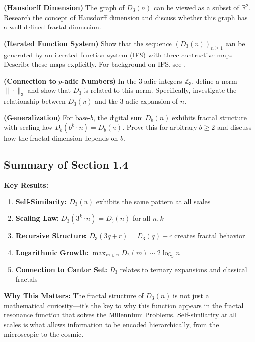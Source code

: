 \begin{exercise}
\textbf{(Hausdorff Dimension)} The graph of $D_3(n)$ can be viewed as a subset of $\mathbb{R}^2$. Research the concept of Hausdorff dimension and discuss whether this graph has a well-defined fractal dimension.
\end{exercise}

\begin{exercise}
\textbf{(Iterated Function System)} Show that the sequence $(D_3(n))_{n \geq 1}$ can be generated by an iterated function system (IFS) with three contractive maps. Describe these maps explicitly. For background on IFS, see \cite{barnsley1988,hutchinson1981fractals}.
\end{exercise}

\begin{exercise}
\textbf{(Connection to $p$-adic Numbers)} In the 3-adic integers $\mathbb{Z}_3$, define a norm $\|\cdot\|_3$ and show that $D_3$ is related to this norm. Specifically, investigate the relationship between $D_3(n)$ and the 3-adic expansion of $n$.
\end{exercise}

\begin{exercise}
\textbf{(Generalization)} For base-$b$, the digital sum $D_b(n)$ exhibits fractal structure with scaling law $D_b(b^k \cdot n) = D_b(n)$. Prove this for arbitrary $b \geq 2$ and discuss how the fractal dimension depends on $b$.
\end{exercise}

\subsection{Summary of Section 1.4}

\textbf{Key Results:}
\begin{enumerate}
\item \textbf{Self-Similarity:} $D_3(n)$ exhibits the same pattern at all scales
\item \textbf{Scaling Law:} $D_3(3^k \cdot n) = D_3(n)$ for all $n, k$
\item \textbf{Recursive Structure:} $D_3(3q + r) = D_3(q) + r$ creates fractal behavior
\item \textbf{Logarithmic Growth:} $\max_{m \leq n} D_3(m) \sim 2\log_3 n$
\item \textbf{Connection to Cantor Set:} $D_3$ relates to ternary expansions and classical fractals
\end{enumerate}

\textbf{Why This Matters:} The fractal structure of $D_3(n)$ is not just a mathematical curiosity—it's the key to why this function appears in the fractal resonance function that solves the Millennium Problems. Self-similarity at all scales is what allows information to be encoded hierarchically, from the microscopic to the cosmic.

